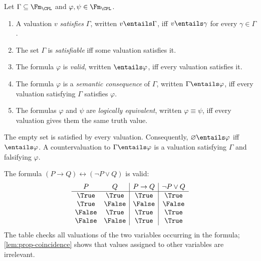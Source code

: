 \begin{definition}
Let \(\Gamma\subseteq\Fm_{\CPL}\) and
\(\varphi,\psi\in\Fm_{\CPL}\).
\begin{enumerate}
  \item A valuation \(v\) \emph{satisfies} \(\Gamma\), written
        \(v\entails\Gamma\), iff \(v\entails\gamma\) for every
        \(\gamma\in\Gamma\).
  \item The set \(\Gamma\) is \emph{satisfiable} iff some valuation satisfies
        it.
  \item The formula \(\varphi\) is \emph{valid}, written
        \(\entails\varphi\), iff every valuation satisfies it.
  \item The formula \(\varphi\) is a \emph{semantic consequence} of
        \(\Gamma\), written \(\Gamma\entails\varphi\), iff every valuation
        satisfying \(\Gamma\) satisfies \(\varphi\).
  \item The formulas \(\varphi\) and \(\psi\) are \emph{logically
        equivalent}, written \(\varphi\equiv\psi\), iff every valuation gives
        them the same truth value.
\end{enumerate}
\end{definition}

The empty set is satisfied by every valuation.  Consequently,
\(\varnothing\entails\varphi\) iff \(\entails\varphi\).  A countervaluation to
\(\Gamma\entails\varphi\) is a valuation satisfying \(\Gamma\) and falsifying
\(\varphi\).

\begin{example}
The formula \((P\to Q)\leftrightarrow(\neg P\lor Q)\) is valid:
\[
\begin{array}{cc|c|c}
P&Q&P\to Q&\neg P\lor Q\\ \hline
\True&\True&\True&\True\\
\True&\False&\False&\False\\
\False&\True&\True&\True\\
\False&\False&\True&\True
\end{array}
\]
The table checks all valuations of the two variables occurring in the formula;
\cref{lem:prop-coincidence} shows that values assigned to other variables are
irrelevant.
\end{example}

